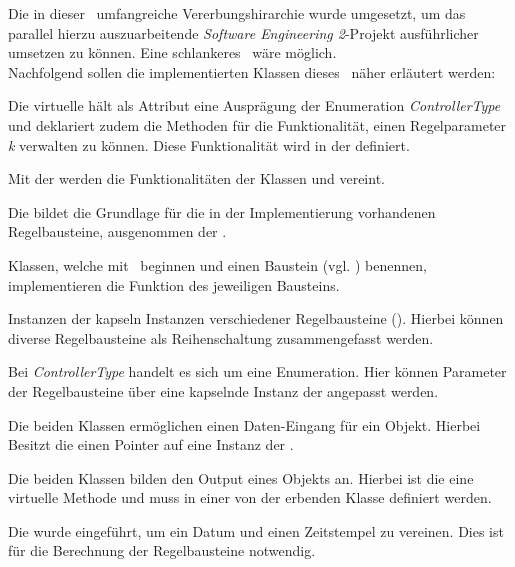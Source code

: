 Die in dieser \Pack\ umfangreiche Vererbungshirarchie wurde umgesetzt, um das parallel hierzu auszuarbeitende \textit{Software Engineering 2}-Projekt ausführlicher umsetzen zu können. Eine schlankeres \Pack\ wäre möglich.\\
Nachfolgend sollen die implementierten Klassen dieses \Pack\ näher erläutert werden:


Die virtuelle  hält als Attribut eine Ausprägung der Enumeration \textit{ControllerType} und deklariert zudem die Methoden für die Funktionalität, einen Regelparameter \textit{k} verwalten zu können. Diese Funktionalität wird in der  definiert.


Mit der  werden die Funktionalitäten der Klassen  und  vereint.


Die  bildet die Grundlage für die in der Implementierung vorhandenen Regelbausteine, ausgenommen der .


\clearpage
{}
Klassen, welche mit \glqq {}\grqq\ beginnen und einen Baustein (vgl. ) benennen, implementieren die Funktion des jeweiligen Bausteins.


Instanzen der  kapseln Instanzen verschiedener Regelbausteine (). Hierbei können diverse Regelbausteine als Reihenschaltung zusammengefasst werden.\\


Bei \textit{ControllerType} handelt es sich um eine Enumeration. Hier können Parameter der Regelbausteine über eine kapselnde Instanz der  angepasst werden.\\


Die beiden Klassen ermöglichen einen Daten-Eingang für ein Objekt. Hierbei Besitzt die  einen Pointer auf eine Instanz der .


Die beiden Klassen bilden den Output eines Objekts an. Hierbei ist die  eine virtuelle Methode und muss in einer von der  erbenden Klasse definiert werden.


Die  wurde eingeführt, um ein Datum und einen Zeitstempel zu vereinen. Dies ist für die Berechnung der Regelbausteine notwendig.